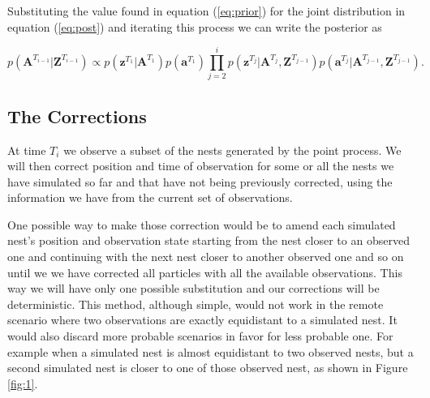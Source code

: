 \documentclass[11pt,a4paper]{article}
\renewcommand{\vec}[1]{\mathbf{#1}}
\begin{document}
{{Substituting the value found in equation (\ref{eq:prior}) for the joint distribution in equation (\ref{eq:post}) and iterating this process we can write the posterior as

\begin{equation} \label{eq:post2}
    p(\vec{A}^{T_{i-1}} | \vec{Z}^{T_{i-1}}) \propto p(\vec{z}^{T_1} | \vec{A}^{T_1}) p(\vec{a}^{T_1}) \prod_{j=2}^i p(\vec{z}^{T_j} | \vec{A}^{T_j}, \vec{Z}^{T_{j-1}}) p(\vec{a}^{T_j} | \vec{A}^{T_{j-1}}, \vec{Z}^{T_{j-1}}).
\end{equation}

}

{\color{red}
\subsection{The Corrections} \label{subsec:corrections}

At time $T_i$ we observe a subset of the nests generated by the point process. We will then correct position and time of observation for some or all the nests we have simulated so far and that have not being previously corrected, using the information we have from the current set of observations.

One possible way to make those correction would be to amend each simulated nest's position and observation state starting from the nest closer to an observed one and continuing with the next nest closer to another observed one and so on until we we have corrected all particles with all the available observations. This way we will have only one possible substitution and our corrections will be deterministic. This method, although simple, would not work in the remote scenario where two observations are exactly equidistant to a simulated nest. It would also discard more probable scenarios in favor for less probable one. For example when a simulated nest is almost equidistant to two observed nests, but a second simulated nest is closer to one of those observed nest, as shown in Figure \ref{fig:1}.

\begin{figure*}
\centering
\caption{[A] shows the shortest distance substitution in the deterministic scenario. [B] shows the more likely substitution that would be discarded in the deterministic scenario.}
\label{fig:1}
\end{figure*}

}}
\end{document}
